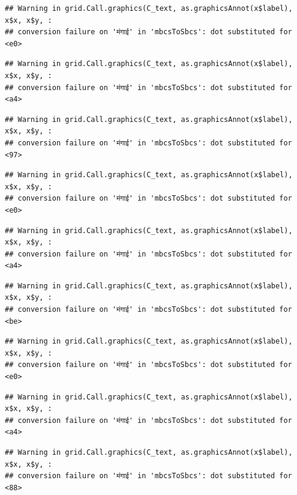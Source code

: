 \documentclass[
]{article}
\begin{document}
\begin{verbatim}
## Warning in grid.Call.graphics(C_text, as.graphicsAnnot(x$label), x$x, x$y, :
## conversion failure on 'मंगाई' in 'mbcsToSbcs': dot substituted for <e0>
\end{verbatim}

\begin{verbatim}
## Warning in grid.Call.graphics(C_text, as.graphicsAnnot(x$label), x$x, x$y, :
## conversion failure on 'मंगाई' in 'mbcsToSbcs': dot substituted for <a4>
\end{verbatim}

\begin{verbatim}
## Warning in grid.Call.graphics(C_text, as.graphicsAnnot(x$label), x$x, x$y, :
## conversion failure on 'मंगाई' in 'mbcsToSbcs': dot substituted for <97>
\end{verbatim}

\begin{verbatim}
## Warning in grid.Call.graphics(C_text, as.graphicsAnnot(x$label), x$x, x$y, :
## conversion failure on 'मंगाई' in 'mbcsToSbcs': dot substituted for <e0>
\end{verbatim}

\begin{verbatim}
## Warning in grid.Call.graphics(C_text, as.graphicsAnnot(x$label), x$x, x$y, :
## conversion failure on 'मंगाई' in 'mbcsToSbcs': dot substituted for <a4>
\end{verbatim}

\begin{verbatim}
## Warning in grid.Call.graphics(C_text, as.graphicsAnnot(x$label), x$x, x$y, :
## conversion failure on 'मंगाई' in 'mbcsToSbcs': dot substituted for <be>
\end{verbatim}

\begin{verbatim}
## Warning in grid.Call.graphics(C_text, as.graphicsAnnot(x$label), x$x, x$y, :
## conversion failure on 'मंगाई' in 'mbcsToSbcs': dot substituted for <e0>
\end{verbatim}

\begin{verbatim}
## Warning in grid.Call.graphics(C_text, as.graphicsAnnot(x$label), x$x, x$y, :
## conversion failure on 'मंगाई' in 'mbcsToSbcs': dot substituted for <a4>
\end{verbatim}

\begin{verbatim}
## Warning in grid.Call.graphics(C_text, as.graphicsAnnot(x$label), x$x, x$y, :
## conversion failure on 'मंगाई' in 'mbcsToSbcs': dot substituted for <88>
\end{verbatim}
\end{document}
